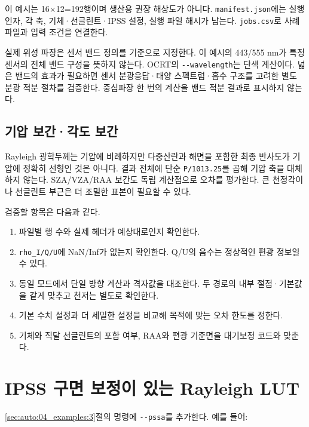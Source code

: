 이 예시는 16\ensuremath{\times}12=192행이며 생산용 권장 해상도가 아니다. \texttt{manifest.\allowbreak{}json}에는 실행 인자, 각 축, 기체·선글린트·IPSS 설정, 실행 파일 해시가 남는다. \texttt{jobs.\allowbreak{}csv}로 사례 파일과 입력 조건을 연결한다.

실제 위성 파장은 센서 밴드 정의를 기준으로 지정한다. 이 예시의 443/555 nm가 특정 센서의 전체 밴드 구성을 뜻하지 않는다. OCRT의 \texttt{-\allowbreak{}-\allowbreak{}wavelength}는 단색 계산이다. 넓은 밴드의 효과가 필요하면 센서 분광응답·태양 스펙트럼·흡수 구조를 고려한 별도 분광 적분 절차를 검증한다. 중심파장 한 번의 계산을 밴드 적분 결과로 표시하지 않는다.

\subsection{기압 보간·각도 보간}
\label{sec:auto:04_examples:3.4}
Rayleigh 광학두께는 기압에 비례하지만 다중산란과 해면을 포함한 최종 반사도가 기압에 정확히 선형인 것은 아니다. 결과 전체에 단순 \texttt{P/\allowbreak{}1013.\allowbreak{}25}를 곱해 기압 축을 대체하지 않는다. SZA/VZA/RAA 보간도 독립 계산점으로 오차를 평가한다. 큰 천정각이나 선글린트 부근은 더 조밀한 표본이 필요할 수 있다.

검증할 항목은 다음과 같다.

\begin{enumerate}
\item 파일별 행 수와 실제 헤더가 예상대로인지 확인한다.
\item \texttt{rho\_\allowbreak{}I/\allowbreak{}Q/\allowbreak{}U}에 NaN/Inf가 없는지 확인한다. Q/U의 음수는 정상적인 편광 정보일 수 있다.
\item 동일 모드에서 단일 방향 계산과 격자값을 대조한다. 두 경로의 내부 절점·기본값을 같게 맞추고 천저는 별도로 확인한다.
\item 기본 수치 설정과 더 세밀한 설정을 비교해 목적에 맞는 오차 한도를 정한다.
\item 기체와 직달 선글린트의 포함 여부, RAA와 편광 기준면을 대기보정 코드와 맞춘다.
\end{enumerate}

\section{IPSS 구면 보정이 있는 Rayleigh LUT}
\label{sec:auto:04_examples:4}
\ref{sec:auto:04_examples:3}절의 명령에 \texttt{-\allowbreak{}-\allowbreak{}pssa}를 추가한다. 예를 들어:


\par\noindent\begin{minipage}{\linewidth}
\end{minipage}\par

